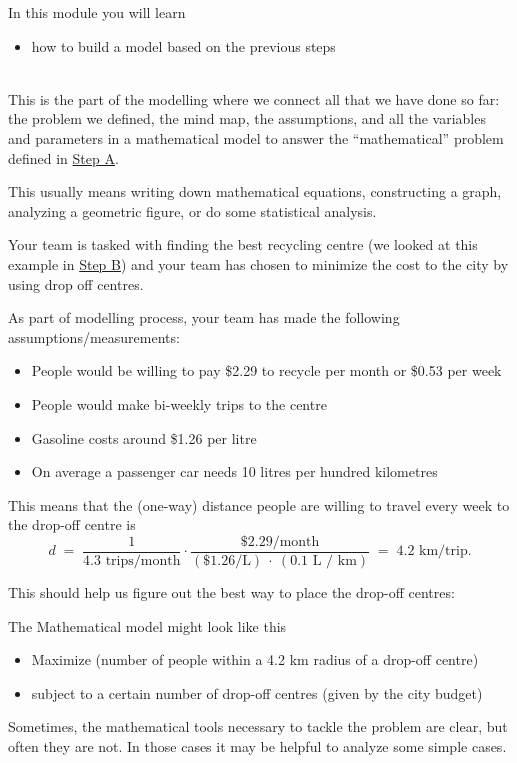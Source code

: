 \begin{siam}

In this module you will learn
\begin{itemize}
	\item how to build a model based on the previous steps
\end{itemize}

\hfill \\



This is the part of the modelling where we connect all that we have done so far: the problem we defined, the mind map, the assumptions, and all the variables and parameters in a mathematical model to answer the ``mathematical'' problem defined in \hyperref[define]{Step A}.

This usually means writing down mathematical equations, constructing a graph, analyzing a geometric figure, or do some statistical analysis. \\


\begin{example}
Your team is tasked with finding the best recycling centre (we looked at this example in \hyperref[mindmap]{Step B}) and your  team has chosen to minimize the cost to the city by using drop off centres.

As part of modelling process, your team has made the following assumptions/measurements:
\begin{itemize}
	\item People would be willing to pay \$2.29 to recycle per month or \$0.53 per week
	\item People would make bi-weekly trips to the centre
	\item Gasoline costs around \$1.26 per litre
	\item On average a passenger car needs 10 litres per hundred kilometres
\end{itemize}

This means that the (one-way) distance people are willing to travel every week to the drop-off centre is
$$
d \;=\; \frac{1}{4.3 \text{ trips/month}} \cdot \frac{\$2.29 / {\text{month}} }{(\$1.26 \text{/L}) \ \cdot\  (0.1 \text{ L / km})} \;=\; 4.2 \text{  km/trip}.
$$

This should help us figure out the best way to place the drop-off centres:

The Mathematical model might look like this

\begin{itemize}
	\item Maximize (number of people within a 4.2 km radius of a drop-off centre)
	\item subject to a certain number of drop-off centres (given by the city budget)
\end{itemize}

	
\end{example}

\hfill

Sometimes, the mathematical tools necessary to tackle the problem are clear, but often they are not. In those cases it may be helpful to analyze some simple cases.

\end{siam}


